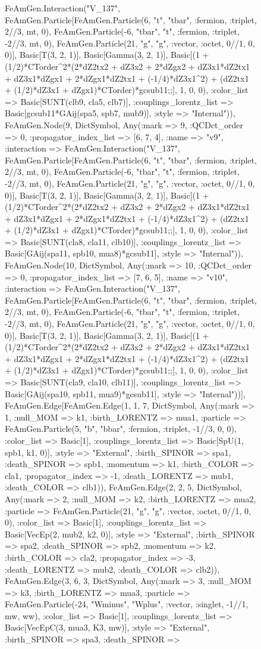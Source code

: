 \documentclass{revtex4}
\begin{document}
\begin{figure}[!htb]
\begin{center}
{FeAmGen.Interaction("V_137", FeAmGen.Particle[FeAmGen.Particle(6, "t", "tbar", :fermion, :triplet, 2//3, mt, 0), FeAmGen.Particle(-6, "tbar", "t", :fermion, :triplet, -2//3, mt, 0), FeAmGen.Particle(21, "g", "g", :vector, :octet, 0//1, 0, 0)], Basic[T(3, 2, 1)], Basic[Gamma(3, 2, 1)], Basic[(1 + (1/2)*CTorder^2*(2*dZ2tx2 + dZ3x2 + 2*dZgx2 + dZ3x1*dZ2tx1 + dZ3x1*dZgx1 + 2*dZgx1*dZ2tx1 + (-1/4)*dZ3x1^2) + (dZ2tx1 + (1/2)*dZ3x1 + dZgx1)*CTorder)*gcsub11;;], 1, 0, 0), :color_list => Basic[SUNT(clb9, cla5, clb7)], :couplings_lorentz_list => Basic[gcsub11*GAij(spa5, spb7, mub9)], :style => "Internal")), FeAmGen.Node(9, Dict{Symbol, Any}(:mark => 9, :QCDct_order => 0, :propagator_index_list => [6, 7, 4], :name => "v9", :interaction => FeAmGen.Interaction("V_137", FeAmGen.Particle[FeAmGen.Particle(6, "t", "tbar", :fermion, :triplet, 2//3, mt, 0), FeAmGen.Particle(-6, "tbar", "t", :fermion, :triplet, -2//3, mt, 0), FeAmGen.Particle(21, "g", "g", :vector, :octet, 0//1, 0, 0)], Basic[T(3, 2, 1)], Basic[Gamma(3, 2, 1)], Basic[(1 + (1/2)*CTorder^2*(2*dZ2tx2 + dZ3x2 + 2*dZgx2 + dZ3x1*dZ2tx1 + dZ3x1*dZgx1 + 2*dZgx1*dZ2tx1 + (-1/4)*dZ3x1^2) + (dZ2tx1 + (1/2)*dZ3x1 + dZgx1)*CTorder)*gcsub11;;], 1, 0, 0), :color_list => Basic[SUNT(cla8, cla11, clb10)], :couplings_lorentz_list => Basic[GAij(spa11, spb10, mua8)*gcsub11], :style => "Internal")), FeAmGen.Node(10, Dict{Symbol, Any}(:mark => 10, :QCDct_order => 0, :propagator_index_list => [7, 6, 5], :name => "v10", :interaction => FeAmGen.Interaction("V_137", FeAmGen.Particle[FeAmGen.Particle(6, "t", "tbar", :fermion, :triplet, 2//3, mt, 0), FeAmGen.Particle(-6, "tbar", "t", :fermion, :triplet, -2//3, mt, 0), FeAmGen.Particle(21, "g", "g", :vector, :octet, 0//1, 0, 0)], Basic[T(3, 2, 1)], Basic[Gamma(3, 2, 1)], Basic[(1 + (1/2)*CTorder^2*(2*dZ2tx2 + dZ3x2 + 2*dZgx2 + dZ3x1*dZ2tx1 + dZ3x1*dZgx1 + 2*dZgx1*dZ2tx1 + (-1/4)*dZ3x1^2) + (dZ2tx1 + (1/2)*dZ3x1 + dZgx1)*CTorder)*gcsub11;;], 1, 0, 0), :color_list => Basic[SUNT(cla9, cla10, clb11)], :couplings_lorentz_list => Basic[GAij(spa10, spb11, mua9)*gcsub11], :style => "Internal"))], FeAmGen.Edge[FeAmGen.Edge(1, 1, 7, Dict{Symbol, Any}(:mark => 1, :null_MOM => k1, :birth_LORENTZ => mua1, :particle => FeAmGen.Particle(5, "b", "bbar", :fermion, :triplet, -1//3, 0, 0), :color_list => Basic[1], :couplings_lorentz_list => Basic[SpU(1, spb1, k1, 0)], :style => "External", :birth_SPINOR => spa1, :death_SPINOR => spb1, :momentum => k1, :birth_COLOR => cla1, :propagator_index => -1, :death_LORENTZ => mub1, :death_COLOR => clb1)), FeAmGen.Edge(2, 2, 5, Dict{Symbol, Any}(:mark => 2, :null_MOM => k2, :birth_LORENTZ => mua2, :particle => FeAmGen.Particle(21, "g", "g", :vector, :octet, 0//1, 0, 0), :color_list => Basic[1], :couplings_lorentz_list => Basic[VecEp(2, mub2, k2, 0)], :style => "External", :birth_SPINOR => spa2, :death_SPINOR => spb2, :momentum => k2, :birth_COLOR => cla2, :propagator_index => -3, :death_LORENTZ => mub2, :death_COLOR => clb2)), FeAmGen.Edge(3, 6, 3, Dict{Symbol, Any}(:mark => 3, :null_MOM => k3, :birth_LORENTZ => mua3, :particle => FeAmGen.Particle(-24, "Wminus", "Wplus", :vector, :singlet, -1//1, mw, ww), :color_list => Basic[1], :couplings_lorentz_list => Basic[VecEpC(3, mua3, K3, mw)], :style => "External", :birth_SPINOR => spa3, :death_SPINOR => }
\end{center}
\end{figure}
\end{document}
